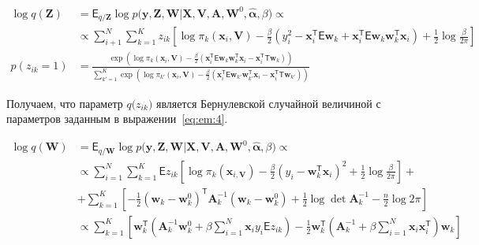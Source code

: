 \documentclass[12pt, twoside]{article}
\numberwithin{equation}{section}
\begin{document}
\begin{equation}
\label{eq:em:4}
\begin{aligned}
\log q\left(\textbf{Z}\right) &= \mathsf{E}_{q/\textbf{Z}} \log p\bigr(\mathbf{y}, \mathbf{Z}, \mathbf{W}|\mathbf{X}, \mathbf{V}, \textbf{A}, \textbf{W}^{0}, \hat{\bm{\alpha}}, \beta\bigr)  \propto\\
&\propto \sum_{i+1}^{N}\sum_{k=1}^{K}z_{ik}\left[\log\pi_{k}\left(\textbf{x}_{i}, \textbf{V}\right) - \frac{\beta}{2}\left(y_{i}^{2} -\textbf{x}_{i}^{\mathsf{T}}\mathsf{E}\textbf{w}_{k} + \textbf{x}_{i}^{\mathsf{T}}\mathsf{E}\textbf{w}_{k}\textbf{w}_{k}^{\mathsf{T}}\textbf{x}_{i}\right) + \frac{1}{2}\log\frac{\beta}{2\pi}\right]\\
p\left(z_{ik} = 1\right) &= \frac{\exp\left(\log\pi_{k}\left(\textbf{x}_{i}, \textbf{V}\right) - \frac{\beta}{2}\left(\textbf{x}_{i}^{\mathsf{T}}\mathsf{E}\textbf{w}_{k}\textbf{w}_{k}^{\mathsf{T}}\textbf{x}_{i} - \textbf{x}_{i}^{\mathsf{T}}\mathsf{T}\textbf{w}_{k}\right)\right)}{\sum_{k'=1}^{K}\exp\left(\log\pi_{k'}\left(\textbf{x}_{i}, \textbf{V}\right) - \frac{\beta}{2}\left(\textbf{x}_{i}^{\mathsf{T}}\mathsf{E}\textbf{w}_{k'}\textbf{w}_{k'}^{\mathsf{T}}\textbf{x}_{i} - \textbf{x}_{i}^{\mathsf{T}}\mathsf{T}\textbf{w}_{k'}\right) \right)}
\end{aligned}
\end{equation}

Получаем, что параметр $q\bigr(z_{ik}\bigr)$ является Бернулевской случайной величиной с параметров заданным в выражении~\eqref{eq:em:4}.

\begin{equation}
\label{eq:em:5}
\begin{aligned}
\log q\left(\textbf{W}\right) &= \mathsf{E}_{q/\textbf{W}}\log p\bigr(\mathbf{y}, \mathbf{Z}, \mathbf{W}|\mathbf{X}, \mathbf{V}, \textbf{A}, \textbf{W}^{0}, \hat{\bm{\alpha}}, \beta\bigr) \propto\\
&\propto \sum_{i=1}^{N}\sum_{k=1}^{K}\mathsf{E}z_{ik}\left[\log\pi_{k}\left(\textbf{x}_{i, \textbf{V}}\right) - \frac{\beta}{2}\left(y_{i} - \textbf{w}_{k}^{\mathsf{T}}\textbf{x}_{i}\right)^{2} + \frac{1}{2}\log\frac{\beta}{2\pi}\right] + \\
&+ \sum_{k=1}^{K}\left[-\frac{1}{2}\left(\textbf{w}_{k} - \textbf{w}_{k}^{0}\right)^{\mathsf{T}}\textbf{A}_{k}^{-1}\left(\textbf{w}_{k} - \textbf{w}_{k}^{0}\right) + \frac{1}{2}\log\det\textbf{A}^{-1}_{k} - \frac{n}{2}\log2\pi\right] \\
&\propto \sum_{k=1}^{K}\left[\textbf{w}_{k}^{\mathsf{T}}\left(\textbf{A}_{k}^{-1}\textbf{w}_{k}^{0}+\beta\sum_{i=1}^{N}\textbf{x}_{i}y_{i}\mathsf{E}z_{ik}\right)-\frac{1}{2}\textbf{w}_{k}^{\mathsf{T}}\left(\textbf{A}_{k}^{-1}+\beta\sum_{i=1}^{N}\textbf{x}_{i}\textbf{x}_{i}^{\mathsf{T}}\right)\textbf{w}_{k}\right]
\end{aligned}
\end{equation}
\end{document}
